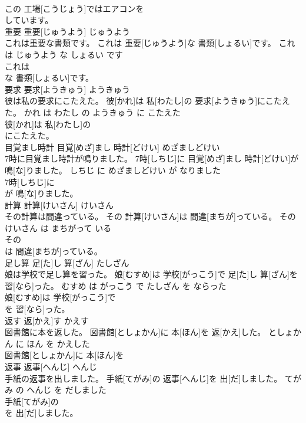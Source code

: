 \documentclass[8pt]{extreport}
\begin{document}
\begin{CJK}{UTF8}{min}
\\	この 工場[こうじょう]ではエアコンを
\\	しています。			
\\	重要	重要[じゅうよう]	じゅうよう	
\\	これは重要な書類です。	これは 重要[じゅうよう]な 書類[しょるい]です。	これ は じゅうよう な しょるい です	
\\	これは
\\	な 書類[しょるい]です。			
\\	要求	要求[ようきゅう]	ようきゅう	
\\	彼は私の要求にこたえた。	彼[かれ]は 私[わたし]の 要求[ようきゅう]にこたえた。	かれ は わたし の ようきゅう に こたえた	
\\	彼[かれ]は 私[わたし]の
\\	にこたえた。			
\\	目覚まし時計	目覚[めざ]まし 時計[どけい]	めざましどけい	
\\	7時に目覚まし時計が鳴りました。	7時[しちじ]に 目覚[めざ]まし 時計[どけい]が 鳴[な]りました。	しちじ に めざましどけい が なりました	
\\	7時[しちじ]に
\\	が 鳴[な]りました。			
\\	計算	計算[けいさん]	けいさん	
\\	その計算は間違っている。	その 計算[けいさん]は 間違[まちが]っている。	その けいさん は まちがって いる	
\\	その
\\	は 間違[まちが]っている。			
\\	足し算	足[た]し 算[ざん]	たしざん	
\\	娘は学校で足し算を習った。	娘[むすめ]は 学校[がっこう]で 足[た]し 算[ざん]を 習[なら]った。	むすめ は がっこう で たしざん を ならった	
\\	娘[むすめ]は 学校[がっこう]で
\\	を 習[なら]った。			
\\	返す	返[かえ]す	かえす	
\\	図書館に本を返した。	図書館[としょかん]に 本[ほん]を 返[かえ]した。	としょかん に ほん を かえした	
\\	図書館[としょかん]に 本[ほん]を
\\	返事	返事[へんじ]	へんじ	
\\	手紙の返事を出しました。	手紙[てがみ]の 返事[へんじ]を 出[だ]しました。	てがみ の へんじ を だしました	
\\	手紙[てがみ]の
\\	を 出[だ]しました。			

\end{CJK}
\end{document}

